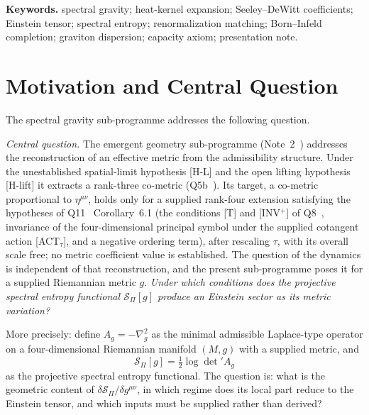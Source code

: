 \documentclass[11pt,a4paper]{article}
\theoremstyle{definition}
\newcommand{\SPI}{\mathcal{S}_\Pi}
\begin{document}
  \medskip
  \noindent\textbf{Keywords.}
  spectral gravity; heat-kernel expansion; Seeley--DeWitt coefficients; Einstein tensor;
  spectral entropy; renormalization matching; Born--Infeld completion; graviton dispersion;
  capacity axiom; presentation note.

  \newpage
  \tableofcontents

  \newpage

  \section{Motivation and Central Question}
    \label{sec:motivation}

    The spectral gravity sub-programme addresses the following question.

    \medskip
    \noindent\textit{Central question.}
    The emergent geometry sub-programme (Note~2~\cite{Beau2026egnote}) addresses the reconstruction of an
    effective metric from the admissibility structure.
    Under the unestablished spatial-limit hypothesis [H-L] and the open lifting hypothesis [H-lift] it extracts a
    rank-three
    co-metric (Q5b~\cite{Beau2026q5b}).
    Its target, a co-metric proportional to $\eta^{\mu\nu}$, holds only for a supplied rank-four extension
    satisfying the hypotheses of Q11~\cite{Beau2026q11} Corollary~6.1 (the conditions [T] and [INV$^+$] of
    Q8~\cite{BeauQ8},
    invariance of the four-dimensional principal symbol under the supplied cotangent action [ACT$_\tau$], and a
    negative ordering term), after rescaling $\tau$, with
    its overall scale free; no metric coefficient value is established.
    The question of the dynamics is independent of that reconstruction, and the present sub-programme poses it for
    a supplied Riemannian metric $g$.
    \textit{Under which conditions does the projective spectral entropy functional $\SPI[g]$
    produce an Einstein sector as its metric variation?}

    \medskip
    More precisely: define $A_g = -\nabla_g^2$ as the minimal admissible Laplace-type
    operator on a four-dimensional Riemannian manifold $(M,g)$ with a supplied metric, and
    \[
      \SPI[g] = \tfrac{1}{2}\log\det' A_g
    \]
    as the projective spectral entropy functional.
    The question is: what is the geometric content of $\delta\SPI/\delta g^{\mu\nu}$, in
    which regime does its local part reduce to the Einstein tensor, and which inputs must be
    supplied rather than derived?
\end{document}
